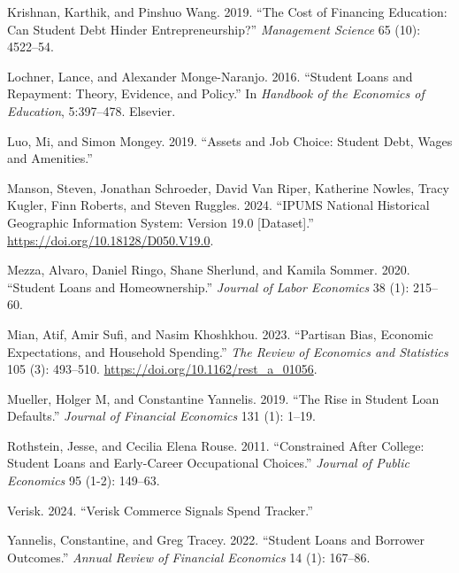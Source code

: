 \documentclass[
  letterpaper,
  DIV=11,
  numbers=noendperiod]{scrartcl}
\newlength{\cslhangindent}
\newenvironment{CSLReferences}[2] %
 {\begin{list}{}{%
  \setlength{\itemindent}{0pt}
  \setlength{\leftmargin}{0pt}
  \setlength{\parsep}{0pt}
  \ifodd #1
   \setlength{\leftmargin}{\cslhangindent}
   \setlength{\itemindent}{-1\cslhangindent}
  \fi
  \setlength{\itemsep}{#2\baselineskip}}}
 {\end{list}}
\begin{document}
\begin{CSLReferences}{1}{0}
Krishnan, Karthik, and Pinshuo Wang. 2019. {``The Cost of Financing
Education: Can Student Debt Hinder Entrepreneurship?''} \emph{Management
Science} 65 (10): 4522--54.

Lochner, Lance, and Alexander Monge-Naranjo. 2016. {``Student Loans and
Repayment: Theory, Evidence, and Policy.''} In \emph{Handbook of the
Economics of Education}, 5:397--478. Elsevier.

Luo, Mi, and Simon Mongey. 2019. {``Assets and Job Choice: Student Debt,
Wages and Amenities.''}

Manson, Steven, Jonathan Schroeder, David Van Riper, Katherine Nowles,
Tracy Kugler, Finn Roberts, and Steven Ruggles. 2024. {``IPUMS National
Historical Geographic Information System: Version 19.0 {[}Dataset{]}.''}
\url{https://doi.org/10.18128/D050.V19.0}.

Mezza, Alvaro, Daniel Ringo, Shane Sherlund, and Kamila Sommer. 2020.
{``Student Loans and Homeownership.''} \emph{Journal of Labor Economics}
38 (1): 215--60.

Mian, Atif, Amir Sufi, and Nasim Khoshkhou. 2023. {``Partisan Bias,
Economic Expectations, and Household Spending.''} \emph{The Review of
Economics and Statistics} 105 (3): 493--510.
\url{https://doi.org/10.1162/rest_a_01056}.

Mueller, Holger M, and Constantine Yannelis. 2019. {``The Rise in
Student Loan Defaults.''} \emph{Journal of Financial Economics} 131 (1):
1--19.

Rothstein, Jesse, and Cecilia Elena Rouse. 2011. {``Constrained After
College: Student Loans and Early-Career Occupational Choices.''}
\emph{Journal of Public Economics} 95 (1-2): 149--63.

Verisk. 2024. {``Verisk Commerce Signals Spend Tracker.''}

Yannelis, Constantine, and Greg Tracey. 2022. {``Student Loans and
Borrower Outcomes.''} \emph{Annual Review of Financial Economics} 14
(1): 167--86.

\end{CSLReferences}
\end{document}
